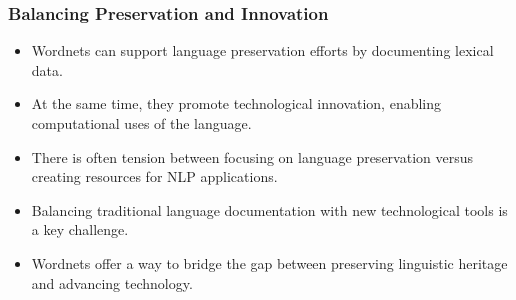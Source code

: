\documentclass[xetex]{beamer}  %
\begin{document}
  


\begin{frame}
\frametitle{Balancing Preservation and Innovation}

\begin{itemize}
    \item Wordnets can support language preservation efforts by documenting lexical data.
    \item At the same time, they promote technological innovation, enabling computational uses of the language.
    \item There is often tension between focusing on language preservation versus creating resources for NLP applications.
    \item Balancing traditional language documentation with new technological tools is a key challenge.
    \item Wordnets offer a way to bridge the gap between preserving linguistic heritage and advancing technology.
\end{itemize}
\end{frame}

\end{document}
